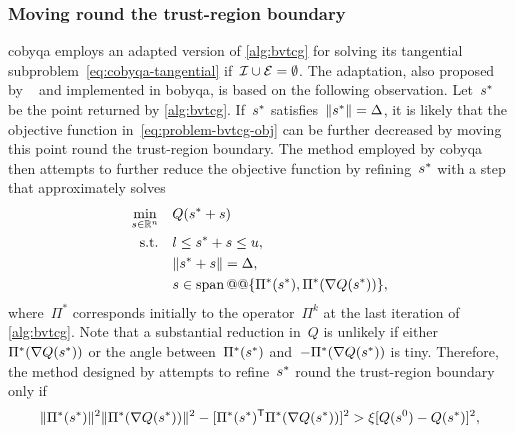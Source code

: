 

\subsubsection{Moving round the trust-region boundary}

\Gls{cobyqa} employs an adapted version of \cref{alg:bvtcg} for solving its tangential subproblem~\cref{eq:cobyqa-tangential} if~$\mathcal{I} \cup \mathcal{E} = \emptyset$.
The adaptation, also proposed by \citeauthor{Powell_2009}~\cite[\S~3]{Powell_2009} and implemented in \gls{bobyqa}, is based on the following observation.
Let~$\sstep[\ast]$ be the point returned by \cref{alg:bvtcg}.
If~$\sstep[\ast]$ satisfies~$\norm{\sstep[\ast]} = \rad$, it is likely that the objective function in~\cref{eq:problem-bvtcg-obj} can be further decreased by moving this point round the trust-region boundary.
The method employed by \gls{cobyqa} then attempts to further reduce the objective function by refining~$\sstep[\ast]$ with a step that approximately solves
\begin{subequations}
    \label{eq:cobyqa-tangential-bounds-alternative}
    \begin{align}
        \min_{\sstep \in \R^n}  & \quad Q(\sstep[\ast] + \sstep)\\
        \text{s.t.}             & \quad \xl \le \sstep[\ast] + \sstep \le \xu,\\
                                & \quad \norm{\sstep[\ast] + \sstep} = \rad,\\
                                & \quad \sstep \in \vspan @@ \set{\Pi^{\ast}(\sstep[\ast]), \Pi^{\ast}(\nabla Q(\sstep[\ast]))},
    \end{align}
\end{subequations}
where~$\Pi^{\ast}$ corresponds initially to the operator~$\Pi^k$ at the last iteration of \cref{alg:bvtcg}.
Note that a substantial reduction in~$Q$ is unlikely if either~$\Pi^{\ast}(\nabla Q(\sstep[\ast]))$ or the angle between~$\Pi^{\ast}(\sstep[\ast])$ and~$-\Pi^{\ast}(\nabla Q(\sstep[\ast]))$ is tiny.
Therefore, the method designed by \citeauthor{Powell_2009} attempts to refine~$\sstep[\ast]$ round the trust-region boundary only if
\begin{equation*}
    \norm{\Pi^{\ast}(\sstep[\ast])}^2 \norm{\Pi^{\ast}(\nabla Q(\sstep[\ast]))}^2 - [\Pi^{\ast}(\sstep[\ast])^{\T} \Pi^{\ast}(\nabla Q(\sstep[\ast]))]^2 > \xi [Q(\sstep[0]) - Q(\sstep[\ast])]^2,
\end{equation*}
